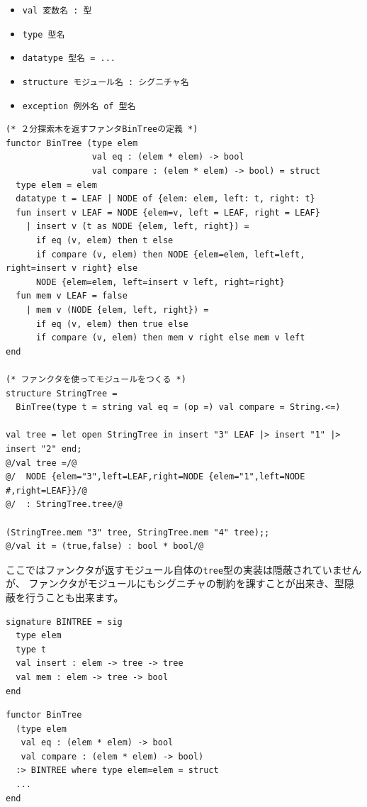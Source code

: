 \documentclass[11pt,a4paper]{article}
\begin{document}
\begin{itemize}
\item \lstinline{val 変数名 : 型}
\item \lstinline{type 型名}
\item \lstinline{datatype 型名 = ...}
\item \lstinline{structure モジュール名 : シグニチャ名}
\item \lstinline{exception 例外名 of 型名}
\end{itemize}
\begin{lstlisting}[caption=ファンクタの例]
(* ２分探索木を返すファンタBinTreeの定義 *)
functor BinTree (type elem
                 val eq : (elem * elem) -> bool
                 val compare : (elem * elem) -> bool) = struct
  type elem = elem
  datatype t = LEAF | NODE of {elem: elem, left: t, right: t}
  fun insert v LEAF = NODE {elem=v, left = LEAF, right = LEAF}
    | insert v (t as NODE {elem, left, right}) =
      if eq (v, elem) then t else
      if compare (v, elem) then NODE {elem=elem, left=left, right=insert v right} else
      NODE {elem=elem, left=insert v left, right=right}
  fun mem v LEAF = false
    | mem v (NODE {elem, left, right}) =
      if eq (v, elem) then true else
      if compare (v, elem) then mem v right else mem v left
end

(* ファンクタを使ってモジュールをつくる *)
structure StringTree =
  BinTree(type t = string val eq = (op =) val compare = String.<=)

val tree = let open StringTree in insert "3" LEAF |> insert "1" |> insert "2" end;
@/val tree =/@
@/  NODE {elem="3",left=LEAF,right=NODE {elem="1",left=NODE #,right=LEAF}}/@
@/  : StringTree.tree/@

(StringTree.mem "3" tree, StringTree.mem "4" tree);;
@/val it = (true,false) : bool * bool/@
\end{lstlisting}

ここではファンクタが返すモジュール自体の\lstinline{tree}型の実装は隠蔽されていませんが、
ファンクタがモジュールにもシグニチャの制約を課すことが出来き、型隠蔽を行うことも出来ます。

\begin{minipage}[htb]{0.45\textwidth}
\begin{lstlisting}[caption=２分木のシグニチャ]
signature BINTREE = sig
  type elem
  type t
  val insert : elem -> tree -> tree
  val mem : elem -> tree -> bool
end
\end{lstlisting}
\end{minipage}
\hfill
\begin{minipage}[htb]{0.55\textwidth}
\begin{lstlisting}[caption=BinTreeの再定義,label=code:bin-tree-with-sig]
functor BinTree
  (type elem
   val eq : (elem * elem) -> bool
   val compare : (elem * elem) -> bool)
  :> BINTREE where type elem=elem = struct
  ...
end
\end{lstlisting}
\end{minipage}
\end{document}
